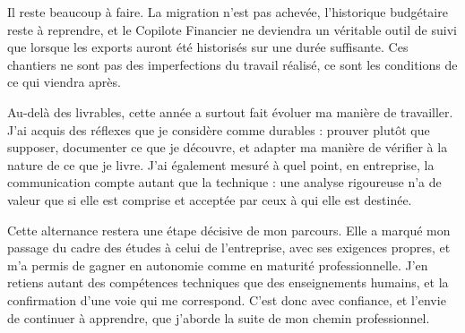 Il reste beaucoup à faire. La migration n'est pas achevée, l'historique budgétaire reste à
reprendre, et le Copilote Financier ne deviendra un véritable outil de suivi que lorsque les
exports auront été historisés sur une durée suffisante. Ces chantiers ne sont pas des
imperfections du travail réalisé, ce sont les conditions de ce qui viendra après.

Au-delà des livrables, cette année a surtout fait évoluer ma manière de travailler. J'ai acquis
des réflexes que je considère comme durables : prouver plutôt que supposer, documenter ce que je
découvre, et adapter ma manière de vérifier à la nature de ce que je livre. J'ai également
mesuré à quel point, en entreprise, la communication compte autant que la technique : une
analyse rigoureuse n'a de valeur que si elle est comprise et acceptée par ceux à qui elle est
destinée.

Cette alternance restera une étape décisive de mon parcours. Elle a marqué mon passage du cadre
des études à celui de l'entreprise, avec ses exigences propres, et m'a permis de gagner en
autonomie comme en maturité professionnelle. J'en retiens autant des compétences techniques que
des enseignements humains, et la confirmation d'une voie qui me correspond. C'est donc avec
confiance, et l'envie de continuer à apprendre, que j'aborde la suite de mon chemin
professionnel.

